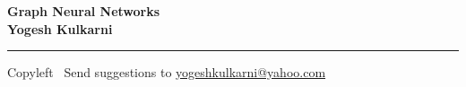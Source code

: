 
\graphicspath{{images/}}

\footnotesize


\begin{center}
\Large{\textbf{Graph Neural Networks\\ Yogesh Kulkarni}}  
\end{center}

\begin{multicols}{2}

\end{multicols}

\rule{\linewidth}{0.25pt}
\scriptsize
Copyleft \textcopyleft\  Send suggestions to 
\href{http://www.yogeshkulkarni.com}{yogeshkulkarni@yahoo.com}



